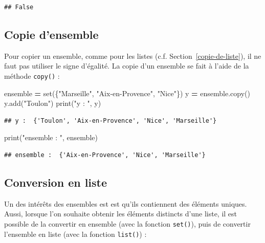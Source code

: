 \documentclass[
  12pt,
]{book}
\newenvironment{Shaded}{\begin{snugshade}}{\end{snugshade}}
\newcommand{\BuiltInTok}[1]{#1}
\newcommand{\NormalTok}[1]{#1}
\newcommand{\OperatorTok}[1]{\textcolor[rgb]{0.81,0.36,0.00}{\textbf{#1}}}
\newcommand{\StringTok}[1]{\textcolor[rgb]{0.31,0.60,0.02}{#1}}
\numberwithin{equation}{section}
\numberwithin{countremarque}{section}
\begin{document}
\begin{lstlisting}
## False
\end{lstlisting}

\subsection{Copie d'ensemble}\label{copie-densemble}

Pour copier un ensemble, comme pour les listes (c.f. Section~\ref{copie-de-liste}), il ne faut pas utiliser le signe d'égalité. La copie d'un ensemble se fait à l'aide de la méthode \texttt{copy()} :

\begin{Shaded}
\begin{Highlighting}[]
\NormalTok{ensemble }\OperatorTok{=} \BuiltInTok{set}\NormalTok{(\{}\StringTok{"Marseille"}\NormalTok{, }\StringTok{"Aix{-}en{-}Provence"}\NormalTok{, }\StringTok{"Nice"}\NormalTok{\})}
\NormalTok{y }\OperatorTok{=}\NormalTok{ ensemble.copy()}
\NormalTok{y.add(}\StringTok{"Toulon"}\NormalTok{)}
\BuiltInTok{print}\NormalTok{(}\StringTok{"y : "}\NormalTok{, y)}
\end{Highlighting}
\end{Shaded}

\begin{lstlisting}
## y :  {'Toulon', 'Aix-en-Provence', 'Nice', 'Marseille'}
\end{lstlisting}

\begin{Shaded}
\begin{Highlighting}[]
\BuiltInTok{print}\NormalTok{(}\StringTok{"ensemble : "}\NormalTok{, ensemble)}
\end{Highlighting}
\end{Shaded}

\begin{lstlisting}
## ensemble :  {'Aix-en-Provence', 'Nice', 'Marseille'}
\end{lstlisting}

\subsection{Conversion en liste}\label{conversion-en-liste}

Un des intérêts des ensembles est est qu'ils contiennent des éléments uniques. Aussi, lorsque l'on souhaite obtenir les éléments distincts d'une liste, il est possible de la convertir en ensemble (avec la fonction \texttt{set()}), puis de convertir l'ensemble en liste (avec la fonction \texttt{list()}) :
\end{document}

